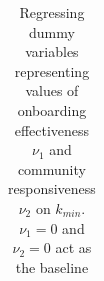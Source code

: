 \documentclass{nws}
\begin{document}
\begin{table}[h]
\centering
\caption{Regressing dummy variables representing values of onboarding effectiveness $\nu_1$ and community responsiveness $\nu_2$ on $k_{min}$. $\nu_1 = 0$ and $\nu_2 = 0$ act as the baseline}
\label{table:regression kmin}
\begin{tabular}{|l|r|r|r|r|} 

\end{tabular}
\end{table}
\end{document}
